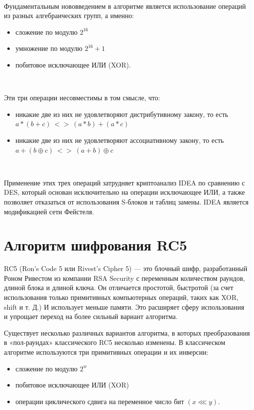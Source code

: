 \documentclass[a4paper]{report}
\begin{document}
~

Фундаментальным нововведением в алгоритме является использование операций из разных алгебраических групп, а именно:
\begin{itemize}
\item сложение по модулю $2^{16}$
\item умножение по модулю $2^{16}+1$
\item побитовое исключающее ИЛИ (XOR).
\end{itemize}

~

Эти три операции несовместимы в том смысле, что:
\begin{itemize}
\item никакие две из них не удовлетворяют дистрибутивному закону, то есть \\ $a*(b+c)\ <>\ (a*b)+(a*c)$
\item никакие две из них не удовлетворяют ассоциативному закону, то есть \\ $a+(b\oplus c)\ <>\ (a+b)\oplus c$
\end{itemize}

~

Применение этих трех операций затрудняет криптоанализ IDEA по сравнению с DES, который основан исключительно на операции исключающее ИЛИ, а также позволяет отказаться от использования S-блоков и таблиц замены. IDEA является модификацией сети Фейстеля.

\section{Алгоритм шифрования RC5}

RC5 (Ron’s Code 5 или Rivest’s Cipher 5) — это блочный шифр, разработанный Роном Ривестом из компании RSA Security с переменным количеством раундов, длиной блока и длиной ключа.
Он отличается простотой, быстротой (за счет использования только примитивных компьютерных операций, таких как XOR, shift и т. Д.) И использует меньше памяти.
Это расширяет сферу использования и упрощает переход на более сильный вариант алгоритма. 



Существует несколько различных вариантов алгоритма, в которых преобразования в «пол-раундах» классического RC5 несколько изменены. В классическом алгоритме используются три примитивных операции и их инверсии:
\begin{itemize}

\item сложение по модулю $\displaystyle 2^{w}$
\item побитовое исключающее ИЛИ (XOR)
\item операции циклического сдвига на переменное число бит $(x \lll y).$
\end{itemize}
\end{document}
